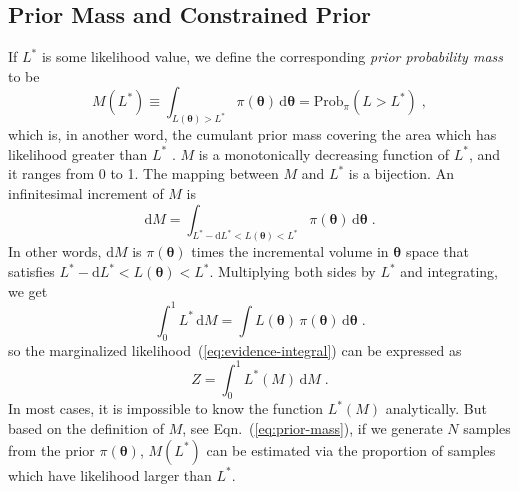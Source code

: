 \documentclass[letterpaper, preprint]{aastex}
\newcommand{\bth} {\boldsymbol \theta}
\newcommand{\md}{\mathrm{d}}
\begin{document}
\subsection{Prior Mass and Constrained Prior}
If $L^*$ is some likelihood value, we define the corresponding {\em prior probability mass} to be
\begin{equation}
M(L^*) \equiv \int_{L(\bth)>L^*}\!\pi(\bth)\,\md\bth = \mathrm{Prob}_\pi(L>L^*)\; ,
 \label{eq:prior-mass}
\end{equation}
which is, in another word, the cumulant prior mass covering the area which has likelihood greater than $L^*$ \citep{skilling06a}. $M$ is a monotonically decreasing function of $L^*$, and it ranges from 0 to 1. The mapping between $M$ and $L^*$ is a bijection. An infinitesimal increment of $M$ is
\begin{equation}
\mathrm{d}M=\int_{L^*-\mathrm{d}L^*<L(\bth)<L^*}\!\pi(\bth)\,\mathrm{d}\bth \; .
\label{eq:dM}
\end{equation}
In other words, $\md M$ is $\pi(\bth)$ times the incremental volume in $\bth$ space that satisfies $L^*-\mathrm{d}L^*<L(\bth)<L^*$. Multiplying both sides by $L^*$ and integrating, we get
\begin{equation}
\int^1_0\! L^*\,\mathrm{d}M=\int\!L(\bth)\,\pi(\bth)\,\mathrm{d}\bth\; .
\label{eq:int-dM}
\end{equation}
so the marginalized likelihood~(\ref{eq:evidence-integral}) can be expressed as
\begin{equation}
Z=\int^1_0\! L^*(M)\,\mathrm{d}M \;.
 \label{eq:evidence-prior-mass}
\end{equation}
In most cases, it is impossible to know the function $L^*(M)$ analytically. But based on the definition of $M$, see Eqn.~(\ref{eq:prior-mass}), if we generate $N$ samples from the prior $\pi(\bth)$, $M(L^*)$ can be estimated via the proportion of samples which have likelihood larger than $L^*$.
\end{document}
